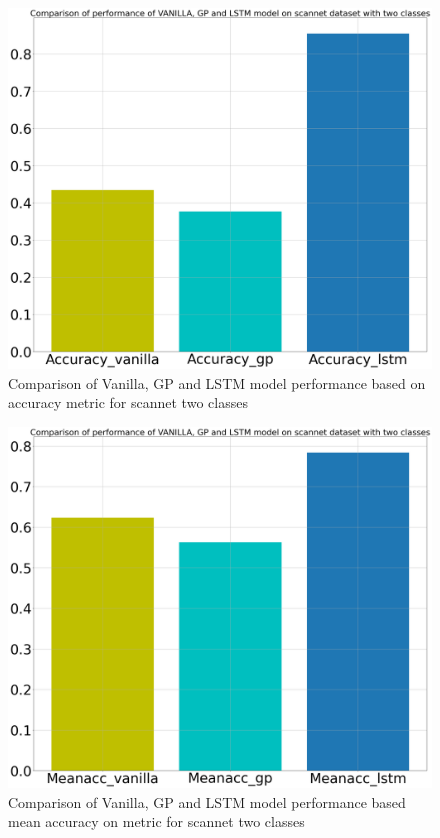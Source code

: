 
	\begin{figure}
		\centering
		\includegraphics[width=12cm]{images/two_classes_acc.png}
		\caption{Comparison of Vanilla, GP and LSTM model performance based on accuracy metric for scannet two classes}
		\label{fig:unet_model_metric_comparison}
	\end{figure}

	\begin{figure}
		\centering
		\includegraphics[width=12cm]{images/two_classes_meanacc.png}
		\caption{Comparison of Vanilla, GP and LSTM model performance based mean accuracy on metric for scannet two classes}
		\label{fig:unet_model_metric_comparison}
	\end{figure}

